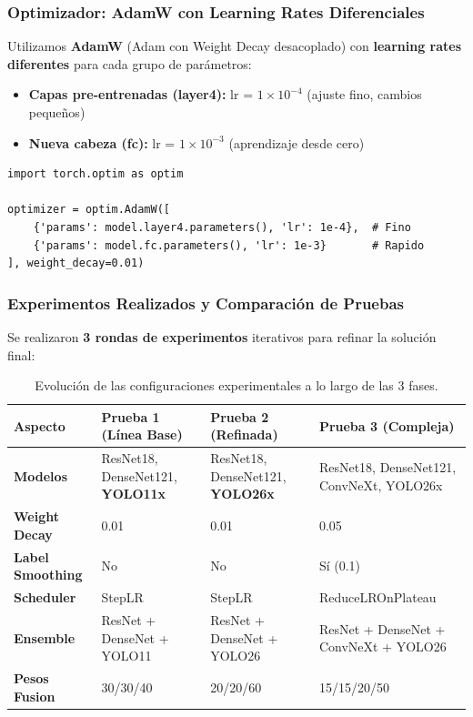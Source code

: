 \documentclass[12pt,a4paper]{article}
\begin{document}
\subsubsection{Optimizador: AdamW con Learning Rates Diferenciales}

Utilizamos \textbf{AdamW} (Adam con Weight Decay desacoplado) con \textbf{learning rates diferentes} para cada grupo de parámetros:

\begin{itemize}
    \item \textbf{Capas pre-entrenadas (layer4):} lr = $1 \times 10^{-4}$ (ajuste fino, cambios pequeños)
    \item \textbf{Nueva cabeza (fc):} lr = $1 \times 10^{-3}$ (aprendizaje desde cero)
\end{itemize}

\begin{lstlisting}[caption={Configuración del optimizador con LR diferencial}]
import torch.optim as optim

optimizer = optim.AdamW([
    {'params': model.layer4.parameters(), 'lr': 1e-4},  # Fino
    {'params': model.fc.parameters(), 'lr': 1e-3}       # Rapido
], weight_decay=0.01)
\end{lstlisting}

\subsubsection{Experimentos Realizados y Comparación de Pruebas}

Se realizaron \textbf{3 rondas de experimentos} iterativos para refinar la solución final:

\begin{table}[H]
\centering
{}
\small
\begin{tabular}{lp{4cm}p{4cm}p{4cm}}
\toprule
\textbf{Aspecto} & \textbf{Prueba 1 (Línea Base)} & \textbf{Prueba 2 (Refinada)} & \textbf{Prueba 3 (Compleja)} \\
\midrule
\textbf{Modelos} & ResNet18, DenseNet121, \textbf{YOLO11x} & ResNet18, DenseNet121, \textbf{YOLO26x} & ResNet18, DenseNet121, ConvNeXt, YOLO26x \\
\rowcolor{lightgray} \textbf{Weight Decay} & 0.01 & 0.01 & 0.05 \\
\textbf{Label Smoothing} & No & No & Sí (0.1) \\
\rowcolor{lightgray} \textbf{Scheduler} & StepLR & StepLR & ReduceLROnPlateau \\
\textbf{Ensemble} & ResNet + DenseNet + YOLO11 & ResNet + DenseNet + YOLO26 & ResNet + DenseNet + ConvNeXt + YOLO26 \\
\rowcolor{lightgray} \textbf{Pesos Fusion} & 30/30/40 & 20/20/60 & 15/15/20/50 \\
\bottomrule
\end{tabular}
\caption{Evolución de las configuraciones experimentales a lo largo de las 3 fases.}
\label{tab:comparacion_pruebas}
\end{table}
\end{document}
